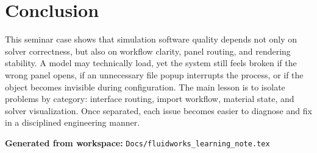 \documentclass[11pt,a4paper]{article}
\begin{document}
\section{Conclusion}
This seminar case shows that simulation software quality depends not only on solver correctness, but also on workflow clarity, panel routing, and rendering stability. A model may technically load, yet the system still feels broken if the wrong panel opens, if an unnecessary file popup interrupts the process, or if the object becomes invisible during configuration. The main lesson is to isolate problems by category: interface routing, import workflow, material state, and solver visualization. Once separated, each issue becomes easier to diagnose and fix in a disciplined engineering manner.

\vfill
\noindent\textbf{Generated from workspace:} \texttt{Docs/fluidworks\_learning\_note.tex}
\end{document}
